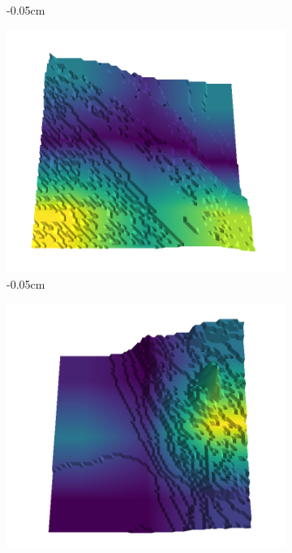\documentclass[../document.tex]{subfiles}
\begin{document}
\begin{figure}[H]
\begin{subfigure}[b]{0.242\linewidth}
        \caption{-0.05cm}
        \end{subfigure}
        \begin{subfigure}[b]{0.242\linewidth}
        \includegraphics[width=\linewidth]{../img/5/quarry/false_negative/09-patch-3d-majavi-colormap-60.png}
        \caption{-0.05cm}
        \end{subfigure}
        \begin{subfigure}[b]{0.242\linewidth}
        \includegraphics[width=\linewidth]{../img/5/quarry/false_negative/09-patch-3d-majavi-colormap-65.png}

\end{subfigure}
\end{figure}
\end{document}
